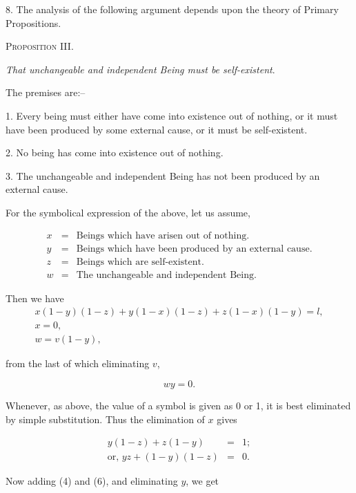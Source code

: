 \documentclass[oneside]{book}
\begin{document}
8. The analysis of the following argument depends upon the
theory of Primary Propositions.

\begin{center}
\textsc{Proposition III}.
\end{center}

\textit{That unchangeable and independent Being must be self-existent}.

The premises are:--

1. Every being must either have come into existence out of
nothing, or it must have been produced by some external cause,
or it must be self-existent.

2. No being has come into existence out of nothing.

3. The unchangeable and independent Being has not been
produced by an external cause.

For the symbolical expression of the above, let us assume,

\begin{eqnarray*}
x &=& \textrm{Beings which have arisen out of nothing.} \\
y &=& \textrm{Beings which have been produced by an external cause.} \\
z &=& \textrm{Beings which are self-existent.} \\
w &=& \textrm{The unchangeable and independent Being.}
\end{eqnarray*}

Then we have
\setcounter{equation}{0}
\begin{eqnarray}
x(1-y)(1-z) + y(1-x)(1-z) + z(1-x) (1-y) = l, \\ %
x = 0, \\ %
w = v(1-y),  %
\end{eqnarray}

from the last of which eliminating $v$,

\begin{equation}
wy = 0. %
\end{equation}

Whenever, as above, the value of a symbol is given as 0 or 1, it
is best eliminated by simple substitution. Thus the elimination
of $x$ gives

\begin{eqnarray}
y(1-z) + z(1-y) &=& 1; \\ %
\textrm{or, } yz + (1-y)(1-z) &=& 0. %
\end{eqnarray}

Now adding (4) and (6), and eliminating $y$, we get
\end{document}
